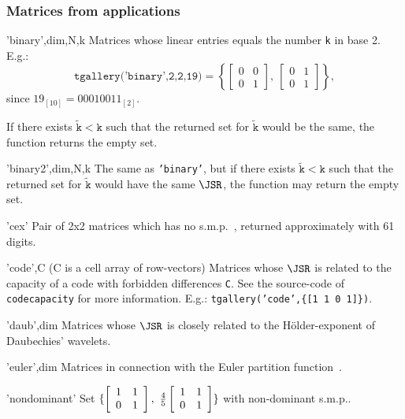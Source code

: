 \subsubsection{Matrices from applications}
\begin{param}
\item['binary',dim,N,k] Matrices whose linear entries equals the number \texttt{k} in base 2. E.g.:  
\begin{equation*}
\texttt{tgallery('binary',2,2,19)}=
\left\{ 
\left[ \begin{array}{cc}0&0\\0&1\end{array} \right],\ 
\left[ \begin{array}{cc}0&1\\0&1\end{array} \right]
\right\},
\end{equation*}
since $19_{[10]}=00010011_{[2]}$.

If there exists $\tilde{\texttt{k}}<\texttt{k}$ such that the returned set for  $\tilde{\texttt{k}}$ would be the same, the function returns the empty set.
\item['binary2',dim,N,k] The same as \texttt{'binary'}, but if there exists $\tilde{\texttt{k}}<\texttt{k}$ such that the returned set for $\tilde{\texttt{k}}$ would have the same $\JSR$, the function may return the empty set.
\item['cex'] Pair of 2x2 matrices which has no s.m.p.~\cite{TB00}, returned approximately with 61 digits.
\item['code',C] (C is a cell array of row-vectors) Matrices whose $\JSR$ is related to the capacity of a code with forbidden differences \texttt{C}. See the source-code of \texttt{codecapacity} for more information. E.g.: 
\texttt{tgallery('code',\{[1 1 0 1]\})}.
\item['daub',dim] Matrices whose $\JSR$ is closely related to the Hölder-exponent of Daubechies' wavelets.
\item['euler',dim] Matrices in connection with the Euler partition function~\cite{GP13}.
\item['nondominant'] Set $\{ 
\left[\begin{array}{c c}1 & 1\\0& 1\end{array}\right],\  
\tfrac{4}{5}\left[\begin{array}{c c}1 & 1\\0& 1\end{array}\right]
\}$ with non-dominant s.m.p..
\end{param}

